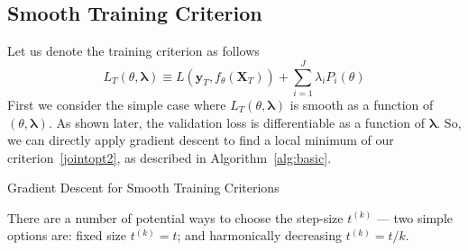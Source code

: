 \documentclass[10pt,letterpaper]{article}
\begin{document}
\subsection{Smooth Training Criterion}
Let us denote the training criterion as follows
\begin{equation}
L_T\left(\theta, \boldsymbol{\lambda}\right) \equiv L(\boldsymbol{y}_T, f_\theta (\boldsymbol{X}_T)) + \sum\limits_{i=1}^J \lambda_i P_i(\theta)
\label{train}
\end{equation}
First we consider the simple case where $L_T\left(\theta, \boldsymbol{\lambda}\right)$ is smooth as a function of $(\theta, \boldsymbol{\lambda})$. As shown later, the validation loss is differentiable as a function of $\boldsymbol{\lambda}$. So, we can directly apply gradient descent to find a local minimum of our criterion~\eqref{jointopt2}, as described in Algorithm~\ref{alg:basic}.

\begin{algorithm}
\caption{Gradient Descent for Smooth Training Criterions}
\label{alg:basic}
\begin{algorithmic}
	\ENDFOR
\end{algorithmic}
\end{algorithm}
There are a number of potential ways to choose the step-size $t^{(k)}$ --- two simple options are: fixed size $t^{(k)} = t$; and harmonically decreasing $t^{(k)} = t/k$.\\
\vspace{1mm}
\end{document}
